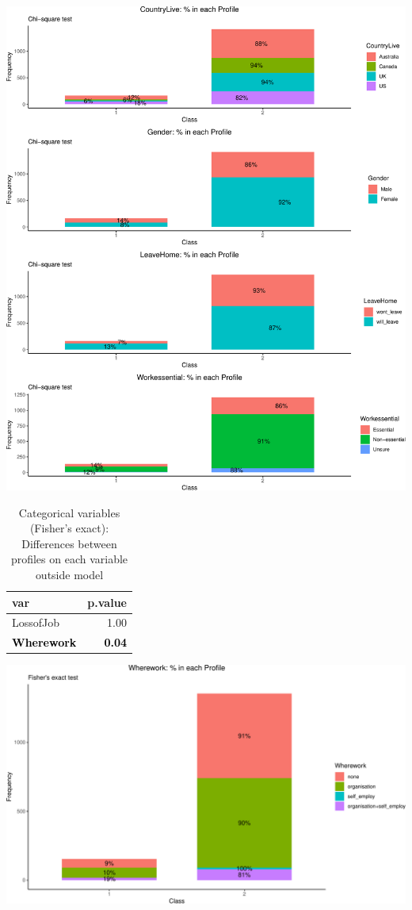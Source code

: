 \documentclass[]{article}
\begin{document}
\begin{center}\includegraphics{lpa_analyses_files/figure-latex/unnamed-chunk-11-1} \end{center}

\newpage
\begin{table}[H]

\caption{\label{tab:unnamed-chunk-12}Categorical variables (Fisher's exact): Differences between profiles on each variable outside model}
\centering
\fontsize{6}{8}\selectfont
\begin{tabular}[t]{lr}
\toprule
var & p.value\\
\midrule
LossofJob & 1.00\\
\textcolor{black}{\textbf{Wherework}} & \textcolor{black}{\textbf{0.04}}\\
\bottomrule
\end{tabular}
\end{table}

\begin{center}\includegraphics{lpa_analyses_files/figure-latex/unnamed-chunk-12-1} \end{center}
\end{document}
